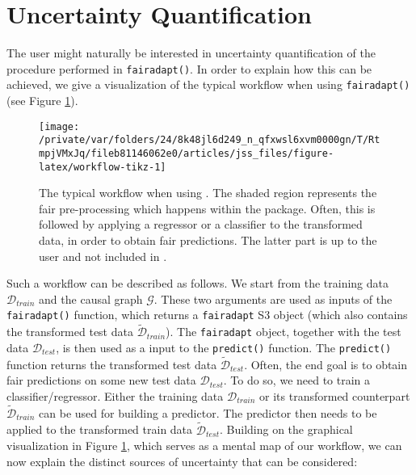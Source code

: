 \documentclass[
  nojss]{jss}
\begin{document}
\hypertarget{sec:uncq}{%
\section{Uncertainty Quantification}\label{sec:uncq}}

The user might naturally be interested in uncertainty quantification of
the procedure performed in \texttt{fairadapt()}. In order to explain how
this can be achieved, we give a visualization of the typical workflow
when using \texttt{fairadapt()} (see Figure \ref{fig:workflow-tikz}).

\begin{CodeChunk}
\begin{figure}

{\centering \texttt{[image: /private/var/folders/24/8k48jl6d249\_n\_qfxwsl6xvm0000gn/T/RtmpjVMxJq/fileb81146062e0/articles/jss\_files/figure-latex/workflow-tikz-1]} 

}

\caption{The typical workflow when using . The shaded region represents the fair pre-processing which happens within the  package. Often, this is followed by applying a regressor or a classifier to the transformed data, in order to obtain fair predictions. The latter part is up to the user and not included in .}\label{fig:workflow-tikz}
\end{figure}
\end{CodeChunk}

Such a workflow can be described as follows. We start from the training
data \(\mathcal{D}_{train}\) and the causal graph \(\mathcal{G}\). These
two arguments are used as inputs of the \texttt{fairadapt()} function,
which returns a \texttt{fairadapt} S3 object (which also contains the
transformed test data \(\widetilde{\mathcal{D}}_{train}\)). The
\texttt{fairadapt} object, together with the test data
\(\mathcal{D}_{test}\), is then used as a input to the
\texttt{predict()} function. The \texttt{predict()} function returns the
transformed test data \(\widetilde{\mathcal{D}}_{test}\). Often, the end
goal is to obtain fair predictions on some new test data
\({\mathcal{D}}_{test}\). To do so, we need to train a
classifier/regressor. Either the training data \(\mathcal{D}_{train}\)
or its transformed counterpart \(\widetilde{\mathcal{D}}_{train}\) can
be used for building a predictor. The predictor then needs to be applied
to the transformed train data \(\widetilde{\mathcal{D}}_{test}\).
Building on the graphical visualization in Figure
\ref{fig:workflow-tikz}, which serves as a mental map of our workflow,
we can now explain the distinct sources of uncertainty that can be
considered:
\end{document}
